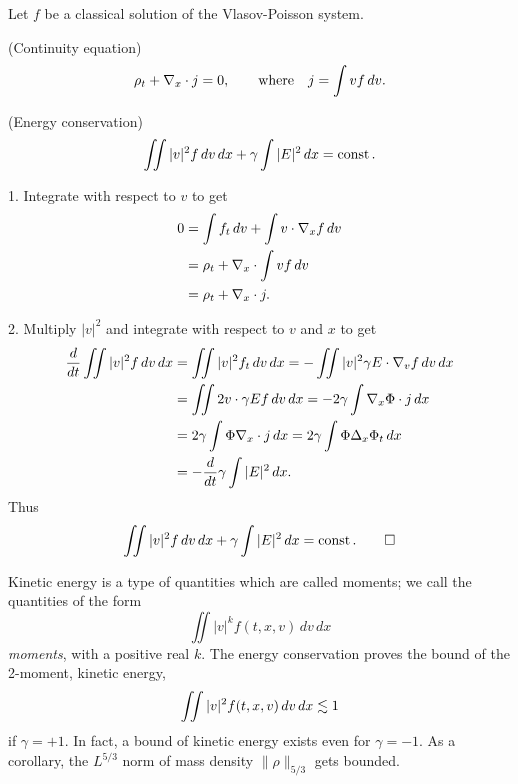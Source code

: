 \documentclass[11pt]{amsart}
\begin{document}
\begin{lem}
Let $f$ be a classical solution of the Vlasov-Poisson system.
\begin{ol}
\item(Continuity equation)
\[\rho_t+\nabla_x\cdot j=0,\qquad\text{where}\quad j=\int vf\,dv.\]
\item(Energy conservation)
\[\iint|v|^2f\,dv\,dx+\gamma\int|E|^2\,dx=\operatorname{const}.\]
\end{ol}
\end{lem}
\begin{pf}
1.
Integrate with respect to $v$ to get
\begin{align*}
0&=\int f_t\,dv+\int v\cdot\nabla_xf\,dv\\
&=\rho_t+\nabla_x\cdot\int vf\,dv\\
&=\rho_t+\nabla_x\cdot j.
\end{align*}

2.
Multiply $|v|^2$ and integrate with respect to $v$ and $x$ to get
\begin{align*}
\dd{t}\iint|v|^2f\,dv\,dx
&=\iint|v|^2f_t\,dv\,dx=-\iint|v|^2\gamma E\cdot\del_vf\,dv\,dx\\
&=\iint2v\cdot\gamma Ef\,dv\,dx=-2\gamma\int\del_x\Phi\cdot j\,dx\\
&=2\gamma\int\Phi\del_x\cdot j\,dx=2\gamma\int\Phi\Delta_x\Phi_t\,dx\\
&=-\dd{t}\gamma\int|E|^2\,dx.
\end{align*}
Thus
\[\iint|v|^2f\,dv\,dx+\gamma\int|E|^2\,dx=\operatorname{const}.\qedhere\]
\end{pf}

Kinetic energy is a type of quantities which are called moments;
we call the quantities of the form
\[\iint|v|^kf(t,x,v)\,dv\,dx\]
\emph{moments}, with a positive real $k$.
The energy conservation proves the bound of the 2-moment, kinetic energy,
\[\iint|v|^2f(t,x,v)\,dv\,dx\lesssim1\]
if $\gamma=+1$.
In fact, a bound of kinetic energy exists even for $\gamma=-1$.
As a corollary, the $L^{5/3}$ norm of mass density $\|\rho\|_{5/3}$ gets bounded.
\end{document}
